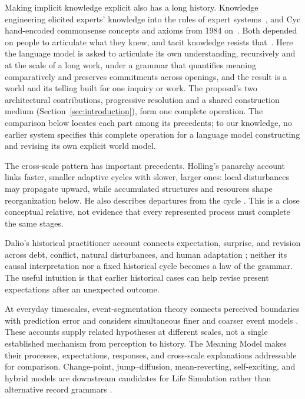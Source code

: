 \documentclass[11pt,a4paper]{article}
\begin{document}
Making implicit knowledge explicit also has a long history. Knowledge
engineering elicited experts' knowledge into the rules of expert
systems~\cite{feigenbaum1977art}, and Cyc hand-encoded commonsense concepts and
axioms from 1984 on~\cite{lenat1995cyc}. Both depended on people to articulate
what they knew, and tacit knowledge resists that~\cite{polanyi1966tacit}. Here the
language model is asked to articulate its own understanding, recursively and at
the scale of a long work, under a grammar that quantifies meaning comparatively and
preserves commitments across openings, and the result is a world and its telling built for one inquiry or work. The proposal's two
architectural contributions, progressive resolution and a shared construction
medium (Section~\ref{sec:introduction}), form one complete operation. The comparison below locates each part among its
precedents; to our knowledge, no earlier system specifies this complete operation
for a language model constructing and revising its own explicit world model.

The cross-scale pattern has important precedents. Holling's panarchy account
links faster, smaller adaptive cycles with slower, larger ones: local
disturbances may propagate upward, while accumulated structures and resources
shape reorganization below. He also describes departures from the cycle
\cite{holling2001complexity}. This is a close conceptual relative, not evidence
that every represented process must complete the same stages.

Dalio's historical practitioner account connects expectation, surprise, and
revision across debt, conflict, natural disturbances, and human adaptation
\cite{bridgewaterDalioGrantham2022}; neither its causal interpretation nor a
fixed historical cycle becomes a law of the grammar.
The useful intuition is that earlier historical cases can help revise present
expectations after an unexpected outcome.

At everyday timescales, event-segmentation theory connects perceived boundaries
with prediction error and considers simultaneous finer and coarser event
models \cite{zacksEtAl2007event}. These accounts supply related hypotheses at
different scales, not a single established mechanism from perception to
history. The Meaning Model makes their processes, expectations, responses,
and cross-scale explanations addressable for comparison. Change-point, jump--diffusion,
mean-reverting, self-exciting, and hybrid models are downstream candidates for
Life Simulation rather than alternative record grammars
\cite{killick2012changepoints,merton1976jump,uhlenbeckOrnstein1930,
hawkes1971,goebel2009hybrid}.
\end{document}
